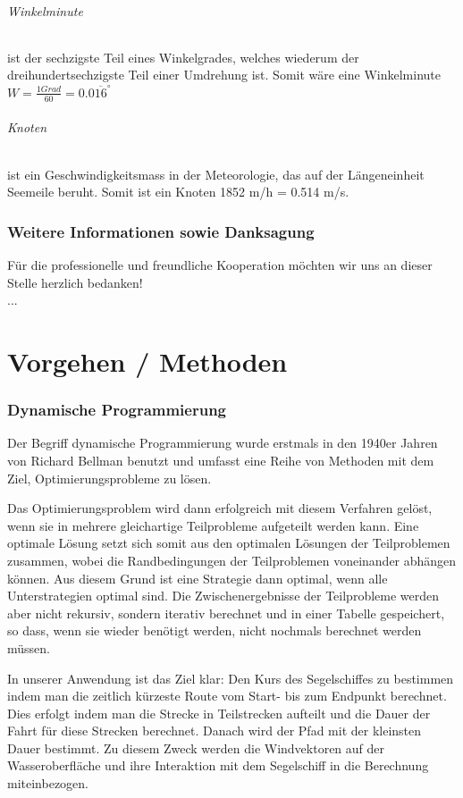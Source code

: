 \documentclass[a4paper,10pt]{article}
\begin{document}
\paragraph{Winkelminute}ist der sechzigste Teil eines Winkelgrades, welches
wiederum der dreihundertsechzigste Teil einer Umdrehung ist. Somit wäre eine
Winkelminute \\ \( W=\frac{1 Grad}{60} = 0.0\overline{16}^\circ \)

\paragraph{Knoten}ist ein Geschwindigkeitsmass in der Meteorologie, das auf der
Längeneinheit Seemeile beruht. Somit ist ein Knoten 1852 m/h = 0.514 m/s.


\section{Weitere Informationen sowie Danksagung}
Für die professionelle und freundliche Kooperation möchten wir uns an
dieser Stelle herzlich bedanken!\\
...

\newpage
\part{Vorgehen / Methoden}
\section{Dynamische Programmierung}
Der Begriff dynamische Programmierung wurde erstmals in den 1940er Jahren von
Richard Bellman benutzt und umfasst eine Reihe von Methoden mit dem Ziel,
Optimierungsprobleme zu lösen. 

Das Optimierungsproblem wird dann erfolgreich mit diesem Verfahren
gelöst, wenn sie in mehrere gleichartige Teilprobleme aufgeteilt werden
kann. Eine optimale Lösung setzt sich somit aus den optimalen Lösungen
der Teilproblemen zusammen, wobei die Randbedingungen der Teilproblemen
voneinander abhängen können.  Aus diesem Grund ist eine Strategie dann
optimal, wenn alle Unterstrategien optimal sind. Die Zwischenergebnisse
der Teilprobleme werden aber nicht rekursiv, sondern iterativ berechnet
und in einer Tabelle gespeichert, so dass, wenn sie wieder benötigt
werden, nicht nochmals berechnet werden müssen.

In unserer Anwendung ist das Ziel klar: Den Kurs des Segelschiffes zu
bestimmen indem man die zeitlich kürzeste Route vom Start- bis zum
Endpunkt berechnet. Dies erfolgt indem man die Strecke in Teilstrecken
aufteilt und die Dauer der Fahrt für diese Strecken berechnet. Danach
wird der Pfad mit der kleinsten Dauer bestimmt. Zu diesem Zweck werden
die Windvektoren auf der Wasseroberfläche und ihre Interaktion mit dem
Segelschiff in die Berechnung miteinbezogen. 
\end{document}
